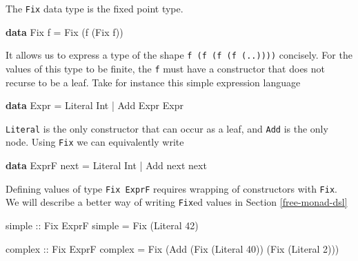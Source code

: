 \documentclass[runningheads,plain]{llncs}
\newenvironment{Shaded}{}{}
\newcommand{\KeywordTok}[1]{\textcolor[rgb]{0.00,0.44,0.13}{\textbf{#1}}}
\newcommand{\DataTypeTok}[1]{\textcolor[rgb]{0.56,0.13,0.00}{#1}}
\newcommand{\DecValTok}[1]{\textcolor[rgb]{0.25,0.63,0.44}{#1}}
\newcommand{\OtherTok}[1]{\textcolor[rgb]{0.00,0.44,0.13}{#1}}
\newcommand{\FunctionTok}[1]{\textcolor[rgb]{0.02,0.16,0.49}{#1}}
\newcommand{\NormalTok}[1]{#1}
\begin{document}
The \texttt{Fix} data type is the fixed point type.

\begin{Shaded}
\begin{Highlighting}[]
\KeywordTok{data} \DataTypeTok{Fix}\NormalTok{ f }\FunctionTok{=} \DataTypeTok{Fix}\NormalTok{ (f (}\DataTypeTok{Fix}\NormalTok{ f))}
\end{Highlighting}
\end{Shaded}

It allows us to express a type of the shape
\texttt{f\ (f\ (f\ (f\ (..))))} concisely. For the values of this type
to be finite, the \texttt{f} must have a constructor that does not
recurse to be a leaf. Take for instance this simple expression language

\begin{Shaded}
\begin{Highlighting}[]
\KeywordTok{data} \DataTypeTok{Expr}
    \FunctionTok{=} \DataTypeTok{Literal} \DataTypeTok{Int}
    \FunctionTok{|} \DataTypeTok{Add} \DataTypeTok{Expr} \DataTypeTok{Expr} 
\end{Highlighting}
\end{Shaded}

\texttt{Literal} is the only constructor that can occur as a leaf, and
\texttt{Add} is the only node. Using \texttt{Fix} we can equivalently
write

\begin{Shaded}
\begin{Highlighting}[]
\KeywordTok{data} \DataTypeTok{ExprF}\NormalTok{ next}
    \FunctionTok{=} \DataTypeTok{Literal} \DataTypeTok{Int}
    \FunctionTok{|} \DataTypeTok{Add}\NormalTok{ next next }
\end{Highlighting}
\end{Shaded}

Defining values of type \texttt{Fix\ ExprF} requires wrapping of
constructors with \texttt{Fix}. We will describe a better way of writing
\texttt{Fix}ed values in Section \ref{free-monad-dsl}

\begin{Shaded}
\begin{Highlighting}[]
\OtherTok{simple ::} \DataTypeTok{Fix} \DataTypeTok{ExprF}
\NormalTok{simple }\FunctionTok{=} \DataTypeTok{Fix}\NormalTok{ (}\DataTypeTok{Literal} \DecValTok{42}\NormalTok{)}

\OtherTok{complex ::} \DataTypeTok{Fix} \DataTypeTok{ExprF}
\NormalTok{complex }\FunctionTok{=} 
    \DataTypeTok{Fix}\NormalTok{ (}\DataTypeTok{Add}\NormalTok{ (}\DataTypeTok{Fix}\NormalTok{ (}\DataTypeTok{Literal} \DecValTok{40}\NormalTok{)) (}\DataTypeTok{Fix}\NormalTok{ (}\DataTypeTok{Literal} \DecValTok{2}\NormalTok{)))}
\end{Highlighting}
\end{Shaded}
\end{document}
